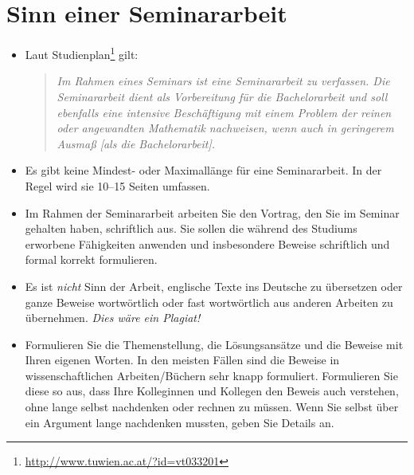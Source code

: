 \documentclass[a4paper,11pt,bibliography=totoc,listof=totoc,headinclude=true,cleardoublepage=empty,oneside]{scrbook}
\begin{document}
\chapter{Sinn einer Seminararbeit}
\label{chapter:sinnfrage}

{\color{change}
\begin{itemize}

\item Laut Studienplan\footnote{\href{http://www.tuwien.ac.at/?id=vt033201}{\ttfamily http://www.tuwien.ac.at/?id=vt033201}}
gilt:
\begin{quote}\itshape
Im Rahmen eines Seminars ist eine Seminararbeit zu verfassen. Die Seminararbeit dient als Vorbereitung für die Bachelorarbeit und soll ebenfalls eine intensive Beschäftigung mit einem Problem der reinen oder angewandten Mathematik nachweisen, wenn auch in geringerem Ausmaß [als die Bachelorarbeit].
\end{quote}

\item Es gibt keine Mindest- oder Maximallänge für eine Seminararbeit. In der Regel wird sie 10--15 Seiten umfassen.

\item Im Rahmen der Seminararbeit arbeiten Sie den Vortrag, den Sie im Seminar gehalten haben, schriftlich aus. 
Sie sollen die während des Studiums erworbene Fähigkeiten anwenden und insbesondere Beweise schriftlich und formal korrekt formulieren. 

\item Es ist {\em nicht} Sinn der Arbeit, englische Texte ins Deutsche zu übersetzen oder ganze
Beweise wortwörtlich oder fast wortwörtlich aus anderen Arbeiten zu übernehmen. {\em Dies wäre ein Plagiat!} 

\item Formulieren Sie die Themenstellung, die Lösungsansätze und die Beweise 
mit Ihren eigenen Worten. In den meisten Fällen sind die Beweise
in wissenschaftlichen Arbeiten/Büchern sehr knapp formuliert. Formulieren Sie diese so
aus, dass Ihre Kolleginnen und Kollegen den Beweis auch verstehen, ohne lange selbst nachdenken
oder rechnen zu müssen. Wenn Sie selbst über ein Argument lange nachdenken mussten,
geben Sie Details an.


\end{itemize}}
\end{document}
